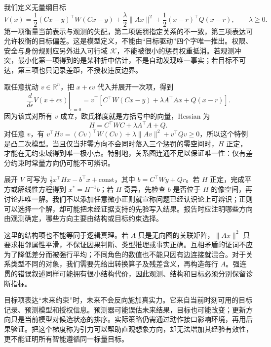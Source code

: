 我们定义无量纲目标
\begin{equation}
 V(x)=\frac12(Cx-y)^\top W(Cx-y)
 +\frac{\lambda}{2}\|Ax\|^2
 +\frac12(x-r)^\top Q(x-r),\qquad \lambda\ge0.
\end{equation}
第一项衡量当前表示与观测的失配，第二项惩罚指定关系的不一致，第三项表达可允许权衡的目标偏差。这是模型定义，不能由“目标驱动”四个字唯一推出。权限、安全与身份规则应另外进入可行域 $\mathcal K$，不能被很小的惩罚权重抵消。若观测冲突，最小化第一项得到的是某种折中估计，不是自动发现唯一事实；若目标不可达，第三项也只记录差距，不授权违反边界。

取任意扰动 $v\in\mathbb R^n$，把 $x+\epsilon v$ 代入并展开一次项，得到
\begin{equation}
 \left.\frac{d}{d\epsilon}V(x+\epsilon v)\right|_{\epsilon=0}
 =v^\top\!\left[C^\top W(Cx-y)+\lambda A^\top Ax+Q(x-r)\right].
\end{equation}
因为该式对所有 $v$ 成立，欧氏梯度就是方括号中的向量，Hessian 为
\begin{equation}
 H=C^\top WC+\lambda A^\top A+Q.
\end{equation}
对任意 $v$，有 $v^\top Hv=(Cv)^\top W(Cv)+\lambda\|Av\|^2+v^\top Qv\ge0$，所以这个特例是凸二次模型。当且仅当非零方向不会同时落入三个惩罚的零空间时，$H$ 正定，才能在无约束域得到唯一极小点。特别地，关系图连通不足以保证唯一性：仅有差分约束时常量方向仍可能不可辨识。

展开 $V$ 可写为 $\frac12x^\top Hx-b^\top x+\mathrm{const}$，其中 $b=C^\top Wy+Qr$。若 $H$ 正定，完成平方或解线性方程得到 $x^*=H^{-1}b$；若 $H$ 奇异，先检查 $b$ 是否位于 $H$ 的像空间，再讨论非唯一解。我们不以添加任意微小正则就宣称问题已经认识论上可辨识；正则可以选择一个解，却可能把未经证据支持的先验写入结果。报告时应注明哪些方向由观测确定，哪些方向主要由结构或目标约束选择。

这里的结构项也不能等同于逻辑真理。若 $A$ 只是无向图的关联矩阵，$\|Ax\|^2$ 只要求相邻属性平滑，不保证因果判断、类型推理或事实正确。互相矛盾的证词不应为了降低差分而被强行平均；不同角色的数值也不能只因有边连接就混合。对于关系类型不同的对象，我们需要先给出转换算子及残差含义，再构造每行 $A$。强连贯的错误叙述同样可能拥有很小结构代价，因此观测、结构和目标必须分别保留诊断指标。

目标项表达“未来约束”时，未来不会反向施加真实力。它来自当前时刻可用的目标记录、预测模型和授权信息。预测器可能误估未来结果，目标也可能改变；更新方向只是当前模型对候选状态的排序。实际策略仍需通过动作接口影响环境，再用后果验证。把这个梯度称为引力可以帮助直观想象方向，却无法增加其经验有效性，更不能证明所有智能遵循同一标量目标。

